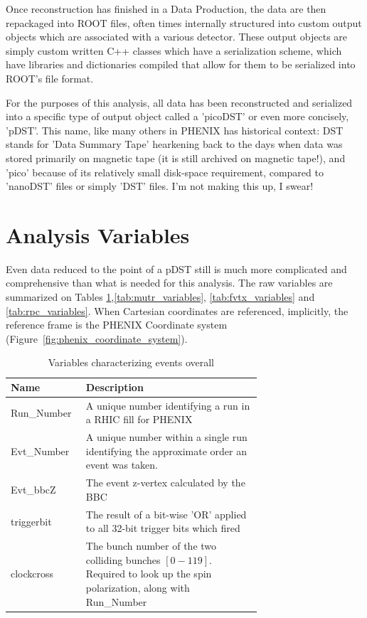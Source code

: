 Once reconstruction has finished in a Data Production, the data are then
repackaged into ROOT files, often times internally structured into custom output
objects which are associated with a various detector. These output objects are
simply custom written C++ classes which have a serialization scheme, which have
libraries and dictionaries compiled that allow for them to be serialized into
ROOT's file format.

For the purposes of this analysis, all data has been reconstructed and
serialized into a specific type of output object called a 'picoDST' or even more
concisely, 'pDST'. This name, like many others in PHENIX has historical context:
DST stands for 'Data Summary Tape' hearkening back to the days when data was
stored primarily on magnetic tape (it is still archived on magnetic tape!), and
'pico' because of its relatively small disk-space requirement, compared to
'nanoDST' files or simply 'DST' files. I'm not making this up, I swear!

\section{Analysis Variables}

Even data reduced to the point of a pDST still is much more complicated and
comprehensive than what is needed for this analysis. The raw variables are
summarized on Tables \ref{tab:evt_variables},\ref{tab:mutr_variables},
\ref{tab:fvtx_variables} and \ref{tab:rpc_variables}. When Cartesian coordinates
are referenced, implicitly, the reference frame is the PHENIX Coordinate system
(Figure~\ref{fig:phenix_coordinate_system}).

\begin{table}[ht]
  \centering
  \begin{tabular}{l p{0.7\linewidth}}
    \toprule
      \textbf{Name} & \textbf{Description} \\
    \midrule
      Run\_Number & A unique number identifying a run in a RHIC fill for PHENIX \\
      Evt\_Number & A unique number within a single run identifying the approximate order an event was taken. \\
      Evt\_bbcZ & The event z-vertex calculated by the BBC \\
      triggerbit & The result of a bit-wise 'OR' applied to all 32-bit trigger bits which fired \\
    clockcross & The bunch number of the two colliding bunches $[0-119]$. Required to look up the spin polarization, along with Run\_Number \\
    \bottomrule
  \end{tabular}
  \caption{Variables characterizing events overall}
  \label{tab:evt_variables}
\end{table}


